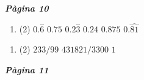 \documentclass[a4paper, pdf, twoside]{book}
\begin{document}
\cleartorightpage
\renewcommand{\baselinestretch}{1.5}
\tableofcontents \cleartorightpage
\renewcommand{\baselinestretch}{1}
\def\currentname{}
\pagestyle{fancy}
\renewcommand{\headrulewidth}{0.5pt}
\fancyhead[LO,RE]{{ \fontfamily{phv}\selectfont \textit{\currentname} }}
\fancyfoot{}
\fontsize{10.5}{12}\selectfont
\begin{multicols}{2}
\def\currentname{Solucions del Tema 1}
\vspace*{0.75cm}

 

\vspace*{0.4cm}
 {}
\vspace{0.3cm}


{\textbf{\em Pàgina 10}} \hrulefill
\begin{enumerate}
\vspace{0.25cm}



 \item[\fontfamily{phv}\selectfont\color{blue}\textbf{1}. ] 
 \begin{tasks}[column-sep=1em, item-indent=1.3333em](2)
	 \task $0.\hat 6$
	 \task $0.75$
	 \task $0.2\hat 3$
	 \task $0.24$
	 \task $0.875$
	 \task $0.\widehat {81}$
\end{tasks}
 \end{enumerate}
\begin{enumerate}
\vspace{0.25cm}



 \item[\fontfamily{phv}\selectfont\color{blue}\textbf{2}. ] 
 \begin{tasks}[column-sep=1em, item-indent=1.3333em](2)
	 \task $233/99$
	 \task $431821/3300$
	 \task $1$
\end{tasks}
 \end{enumerate}
\vspace{0.3cm}


{\textbf{\em Pàgina 11}} \hrulefill
\begin{enumerate}
\vspace{0.25cm}



\end{enumerate}
\end{multicols}
\end{document}
